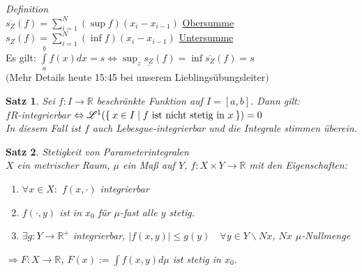 \documentclass[11pt]{memoir}
\theoremstyle{changebreak}
\newtheorem{Satz}{Satz}[chapter]
\begin{document}
\emph{Definition} \\
$\overline{s_Z}(f) = \sum\limits_{i=1}^N (\sup f)(x_i  - x_{i-1})$ \underline{Obersumme} \\
\underline{$s_Z$}$(f) = \sum\limits_{i=1}^N (\inf f)(x_i - x_{i-1})$ \underline{Untersumme} \\
Es gilt:
$\int\limits_a^b f(x) dx = s \Leftrightarrow \sup_z \underline{s_Z}(f) = \inf \overline{s_Z}(f) = s$ \\
$($Mehr Details heute 15:45 bei unserem Lieblingsübungsleiter$)$

\begin{Satz}
Sei $f: I \rightarrow \mathbb R$ beschränkte Funktion auf $I = [a, b]$. Dann gilt: \\
$f R$-integrierbar $\Leftrightarrow \mathscr L^1(\Set{x \in I | f \text{ ist nicht stetig in } x }) = 0$ \\
In diesem Fall ist $f$ auch Lebesgue-integrierbar und die Integrale stimmen überein.
\end{Satz}



\begin{Satz}
\emph{Stetigkeit von Parameterintegralen} \\
$X$ ein metrischer Raum, $\mu$ ein Maß auf $Y$, $f: X \times Y \rightarrow \mathbb R$ mit den Eigenschaften:
\begin{enumerate}
	\item $\forall x \in X:$ $f(x, \cdotp)$ integrierbar
	\item $f(\cdotp, y)$ ist in $x_0$ für $\mu$-fast alle $y$ stetig.
	\item $\exists g: Y \rightarrow \mathbb R^+$ integrierbar, $|f(x, y)| \leq g(y)\quad \forall y \in Y \backslash Nx$, $Nx$ $\mu$-Nullmenge
\end{enumerate}
$\Rightarrow F: X \rightarrow \mathbb R$, $F(x):= \int f(x, y) d\mu$ ist stetig in $x_0$.
\end{Satz}
\end{document}
